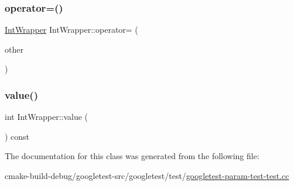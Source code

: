 \mbox{\label{classIntWrapper_a39077b3c0eb1dd8a296a81bfb0a047b3}} 
\subsubsection{\texorpdfstring{operator=()}{operator=()}}
{\footnotesize\ttfamily \mbox{\hyperlink{classIntWrapper}{Int\+Wrapper}} Int\+Wrapper\+::operator= (\begin{DoxyParamCaption}\item[{const \mbox{\hyperlink{classIntWrapper}{Int\+Wrapper}} \&}]{other }\end{DoxyParamCaption})\hspace{0.3cm}{\ttfamily [inline]}}

\mbox{\label{classIntWrapper_a6103e9dc5eb94678985e3c2ac481b508}} 
\subsubsection{\texorpdfstring{value()}{value()}}
{\footnotesize\ttfamily int Int\+Wrapper\+::value (\begin{DoxyParamCaption}{ }\end{DoxyParamCaption}) const\hspace{0.3cm}{\ttfamily [inline]}}



The documentation for this class was generated from the following file\+:\begin{DoxyCompactItemize}
\item 
cmake-\/build-\/debug/googletest-\/src/googletest/test/\mbox{\hyperlink{googletest-param-test-test_8cc}{googletest-\/param-\/test-\/test.\+cc}}\end{DoxyCompactItemize}
